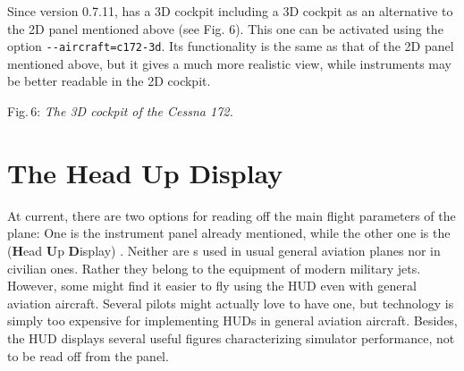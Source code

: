 Since version 0.7.11, \FlightGear{} has a 3D cockpit including a 3D cockpit as an alternative to the 2D panel mentioned above (see Fig. 6). This one can be activated using the option \texttt{-$ $-aircraft=c172-3d}. Its functionality is the same as that of the 2D panel mentioned above, but it gives a much more realistic view, while instruments may be better readable in the 2D cockpit.
\medskip

 \centerline{}

\smallskip
 \noindent
Fig.\,6: \textit{The 3D cockpit of the Cessna 172.}
\medskip


\section{The Head Up Display}

At current, there are two options for reading off the main flight parameters of the
plane: One is the instrument panel already mentioned, while the other one is the
 (\textbf{H}ead \textbf{U}p \textbf{D}isplay) . Neither
are s used in usual general aviation planes nor in civilian ones. Rather they
belong to the equipment of modern military jets. However, some might find it easier to
fly using the HUD even with general aviation aircraft. Several  pilots
might actually love to have one, but technology is simply too expensive for implementing
HUDs in general aviation aircraft. Besides, the HUD displays several useful figures
characterizing simulator performance, not to be read off from the panel.

